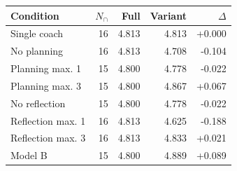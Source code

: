 \begin{tabular}{lrrrr}
\toprule
Condition & $N_\cap$ & Full & Variant & $\Delta$ \\
\midrule
Single coach & 16 & 4.813 & 4.813 & +0.000 \\
No planning & 16 & 4.813 & 4.708 & -0.104 \\
Planning max. 1 & 15 & 4.800 & 4.778 & -0.022 \\
Planning max. 3 & 15 & 4.800 & 4.867 & +0.067 \\
No reflection & 15 & 4.800 & 4.778 & -0.022 \\
Reflection max. 1 & 16 & 4.813 & 4.625 & -0.188 \\
Reflection max. 3 & 16 & 4.813 & 4.833 & +0.021 \\
Model B & 15 & 4.800 & 4.889 & +0.089 \\
\bottomrule
\end{tabular}
